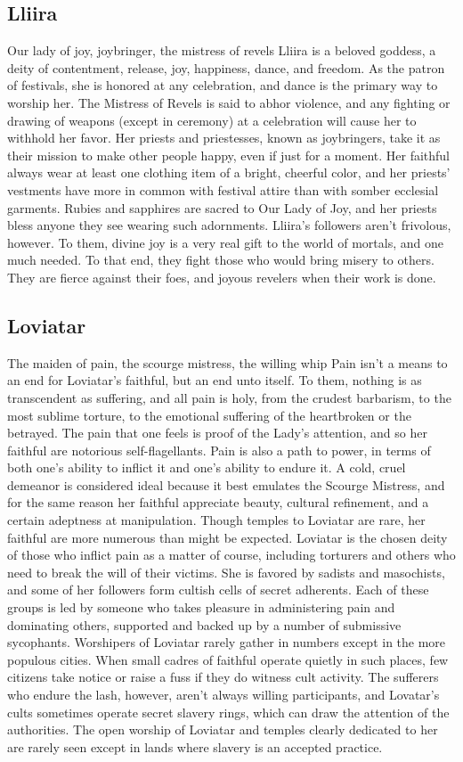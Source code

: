 \documentclass[10pt,a4paper,twoside,twocolumn,openany,bg=print,nodeprecatedcode]{dndbook}
\begin{document}
\subsection{Lliira}
Our lady of joy, joybringer, the mistress of revels
Lliira is a beloved goddess, a deity of contentment, release, joy, happiness, dance, and freedom. As the patron of festivals, she is honored at any celebration, and dance is the primary way to worship her. The Mistress of Revels is said to abhor violence, and any fighting or drawing of weapons (except in ceremony) at a celebration will cause her to withhold her favor. Her priests and priestesses, known as joybringers, take it as their mission to make other people happy, even if just for a moment.
Her faithful always wear at least one clothing item of a bright, cheerful color, and her priests' vestments have more in common with festival attire than with somber ecclesial garments. Rubies and sapphires are sacred to Our Lady of Joy, and her priests bless anyone they see wearing such adornments.
Lliira's followers aren't frivolous, however. To them, divine joy is a very real gift to the world of mortals, and one much needed. To that end, they fight those who would bring misery to others. They are fierce against their foes, and joyous revelers when their work is done.
\subsection{Loviatar}
The maiden of pain, the scourge mistress, the willing whip
Pain isn't a means to an end for Loviatar's faithful, but an end unto itself. To them, nothing is as transcendent as suffering, and all pain is holy, from the crudest barbarism, to the most sublime torture, to the emotional suffering of the heartbroken or the betrayed.
The pain that one feels is proof of the Lady's attention, and so her faithful are notorious self-flagellants. Pain is also a path to power, in terms of both one's ability to inflict it and one's ability to endure it. A cold, cruel demeanor is considered ideal because it best emulates the Scourge Mistress, and for the same reason her faithful appreciate beauty, cultural refinement, and a certain adeptness at manipulation.
Though temples to Loviatar are rare, her faithful are more numerous than might be expected. Loviatar is the chosen deity of those who inflict pain as a matter of course, including torturers and others who need to break the will of their victims. She is favored by sadists and masochists, and some of her followers form cultish cells of secret adherents. Each of these groups is led by someone who takes pleasure in administering pain and dominating others, supported and backed up by a number of submissive sycophants.
Worshipers of Loviatar rarely gather in numbers except in the more populous cities. When small cadres of faithful operate quietly in such places, few citizens take notice or raise a fuss if they do witness cult activity. The sufferers who endure the lash, however, aren't always willing participants, and Lovatar's cults sometimes operate secret slavery rings, which can draw the attention of the authorities. The open worship of Loviatar and temples clearly dedicated to her are rarely seen except in lands where slavery is an accepted practice.
\end{document}
